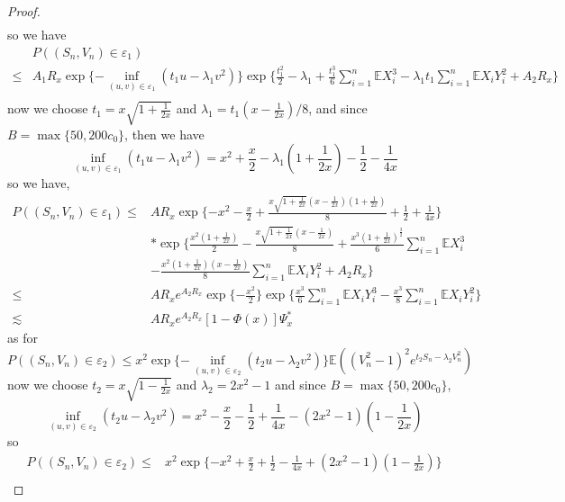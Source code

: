 \documentclass[bj,authoryear]{imsart}
\numberwithin{equation}{section}
\theoremstyle{plain}
\theoremstyle{definition}
\begin{document}
\begin{proof}
\begin{equation}
\begin{aligned}
    \end{aligned}
  \end{equation}
  so we have
  \begin{equation}
    \begin{aligned}
      &P((S_n,V_n)\in\varepsilon_1)\\
      \leq &A_1R_x\exp\{-\inf_{(u,v)\in\varepsilon_1}(t_1u-\lambda_1v^2)\}\exp\{\frac{t_1^2}{2}-\lambda_1+\frac{t_1^3}{6}\sum_{i=1}^{n}\mathbb{E} X_i^3-\lambda_1t_1\sum_{i=1}^{n}\mathbb{E} X_iY_i^2+A_2R_x\}\\
    \end{aligned}
  \end{equation}
  now we choose $t_1 = x\sqrt{1+\frac{1}{2x}}$ and $\lambda_1 = t_1(x-\frac{1}{2x})/8$, and since $B = \max\{50,200c_0\}$, then we have $$\inf_{(u,v)\in\varepsilon_1}(t_1u-\lambda_1v^2) = x^2+\frac{x}{2}-\lambda_1(1+\frac{1}{2x})-\frac{1}{2}-\frac{1}{4x}$$
  so we have,
  \begin{equation}
    \begin{aligned}
      P((S_n,V_n)\in\varepsilon_1)\leq &AR_x\exp\{-x^2-\frac{x}{2}+\frac{x\sqrt{1+\frac{1}{2x}}(x-\frac{1}{2x})(1+\frac{1}{2x})}{8}+\frac{1}{2}+\frac{1}{4x}\}\\
      &*\exp\{\frac{x^2(1+\frac{1}{2x})}{2}-\frac{x\sqrt{1+\frac{1}{2x}}(x-\frac{1}{2x})}{8}+\frac{x^3(1+\frac{1}{2x})^{\frac{3}{2}}}{6}\sum_{i=1}^{n}\mathbb{E} X_i^3\\
      &-\frac{x^2(1+\frac{1}{2x})(x-\frac{1}{2x})}{8}\sum_{i=1}^{n}\mathbb{E} X_iY_i^2+ A_2R_x\}\\
      \leq &AR_xe^{A_2R_x}\exp\{-\frac{x^2}{2}\}\exp\{\frac{x^3}{6}\sum_{i=1}^{n}\mathbb{E} X_iY_i^3-\frac{x^3}{8}\sum_{i=1}^{n}\mathbb{E} X_iY_i^2\}\\
      \lesssim & AR_xe^{A_2R_x}[1-\Phi(x)]\Psi_{x}^{*}
    \end{aligned}
  \end{equation}
  as for $$P((S_n,V_n)\in\varepsilon_2)\leq x^2\exp\{-\inf_{(u,v)\in\varepsilon_2}(t_2u-\lambda_2v^2)\}\mathbb{E} \left((V_n^2-1)^2e^{t_2S_n-\lambda_2V_n^2}\right)$$
  now we choose $t_2 = x\sqrt{1-\frac{1}{2x}}$ and $\lambda_2 = 2x^2-1$ and since $B = \max\{50,200c_0\}$,
  $$\inf_{(u,v)\in\varepsilon_2}(t_2u-\lambda_2v^2) = x^2-\frac{x}{2}-\frac{1}{2}+\frac{1}{4x}-(2x^2-1)(1-\frac{1}{2x})$$
  so
  \begin{equation}
    \begin{aligned}
      P((S_n,V_n)\in\varepsilon_2)\leq &x^2\exp\{-x^2+\frac{x}{2}+\frac{1}{2}-\frac{1}{4x}+(2x^2-1)(1-\frac{1}{2x})\}\\

\end{aligned}
\end{equation}
\end{proof}
\end{document}

